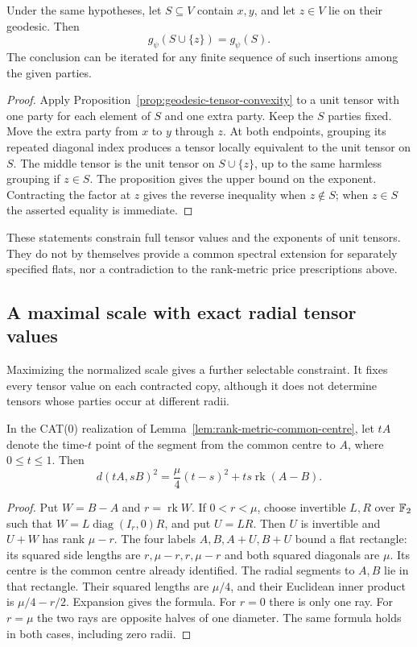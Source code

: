 \begin{corollary}
\label{cor:unit-geodesic-insertion}
Under the same hypotheses, let $S\subseteq V$ contain $x,y$, and
let $z\in V$ lie on their geodesic. Then
\[
 g_\psi(S\cup\{z\})=g_\psi(S).
\]
The conclusion can be iterated for any finite sequence of such
insertions among the given parties.
\end{corollary}
\begin{proof}
Apply Proposition~\ref{prop:geodesic-tensor-convexity} to a unit
tensor with one party for each element of $S$ and one extra party.
Keep the $S$ parties fixed. Move the extra party from $x$ to $y$
through $z$. At both endpoints, grouping its repeated diagonal
index produces a tensor locally equivalent to the unit tensor
on $S$. The middle tensor is the unit tensor on $S\cup\{z\}$,
up to the same harmless grouping if $z\in S$. The proposition
gives the upper bound on the exponent. Contracting the factor at
$z$ gives the reverse inequality when $z\notin S$; when $z\in S$
the asserted equality is immediate.
\end{proof}

These statements constrain full tensor values and the exponents of
unit tensors. They do not by themselves provide a common spectral
extension for separately specified flats, nor a contradiction to the
rank-metric price prescriptions above.

\subsection{A maximal scale with exact radial tensor values}

Maximizing the normalized scale gives a further selectable constraint.
It fixes every tensor value on each contracted copy, although it does
not determine tensors whose parties occur at different radii.

\begin{lemma}
\label{lem:rank-radial-metric}
In the CAT(0) realization of
Lemma~\ref{lem:rank-metric-common-centre}, let $tA$ denote the
time-$t$ point of the segment from the common centre to $A$,
where $0\le t\le1$. Then
\begin{equation}\label{eq:rank-radial-metric}
 d(tA,sB)^2=\frac\mu4(t-s)^2+ts\operatorname{rk}(A-B).
\end{equation}
\end{lemma}
\begin{proof}
Put $W=B-A$ and $r=\operatorname{rk}W$. If $0<r<\mu$, choose
invertible $L,R$ over $\mathbb F_2$ such that
$W=L\operatorname{diag}(I_r,0)R$, and put $U=LR$.
Then $U$ is invertible and $U+W$ has rank $\mu-r$.
The four labels $A,B,A+U,B+U$ bound a flat rectangle:
its squared side lengths are $r,\mu-r,r,\mu-r$ and both
squared diagonals are $\mu$. Its centre is the common centre
already identified. The radial segments to $A,B$ lie in that
rectangle. Their squared lengths are $\mu/4$, and their Euclidean
inner product is $\mu/4-r/2$. Expansion gives the formula.
For $r=0$ there is only one ray. For $r=\mu$ the two rays are
opposite halves of one diameter. The same formula holds in both
cases, including zero radii.
\end{proof}

